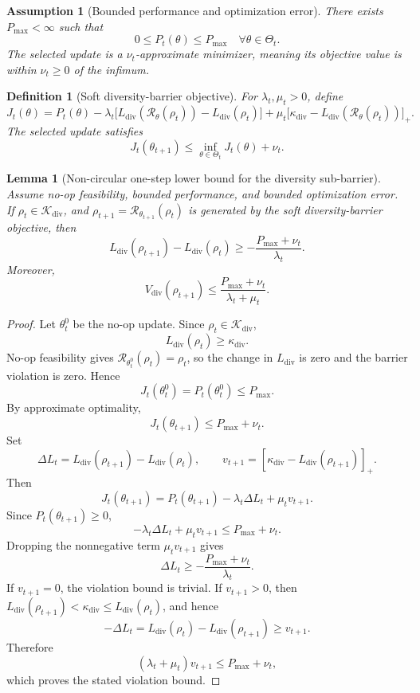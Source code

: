 \documentclass[11pt]{article}
\newtheorem{lemma}[theorem]{Lemma}
\newtheorem{definition}[theorem]{Definition}
\newtheorem{assumption}[theorem]{Assumption}
\newcommand{\K}{\mathcal{K}}
\newcommand{\Rcal}{\mathcal{R}}
\newcommand{\1}{\mathbf{1}}
\newcommand{\diver}{\mathrm{div}}
\begin{document}
\begin{assumption}[Bounded performance and optimization error]
There exists \(P_{\max}<\infty\) such that
\[
0\le P_t(\theta)\le P_{\max}
\quad\forall\theta\in\Theta_t.
\]
The selected update is a \(\nu_t\)-approximate minimizer, meaning its objective value is within \(\nu_t\ge0\) of the infimum.
\end{assumption}

\begin{definition}[Soft diversity-barrier objective]
For \(\lambda_t,\mu_t>0\), define
\[
J_t(\theta)
=
P_t(\theta)
-
\lambda_t\bigl[L_{\diver}(\Rcal_\theta(\rho_t))-L_{\diver}(\rho_t)\bigr]
+
\mu_t\bigl[\kappa_{\diver}-L_{\diver}(\Rcal_\theta(\rho_t))\bigr]_+.
\]
The selected update satisfies
\[
J_t(\theta_{t+1})
\le
\inf_{\theta\in\Theta_t}J_t(\theta)+\nu_t.
\]
\end{definition}

\begin{lemma}[Non-circular one-step lower bound for the diversity sub-barrier]
\label{lem:div_soft_bound}
Assume no-op feasibility, bounded performance, and bounded optimization error. If \(\rho_t\in\K_{\diver}\), and \(\rho_{t+1}=\Rcal_{\theta_{t+1}}(\rho_t)\) is generated by the soft diversity-barrier objective, then
\[
L_{\diver}(\rho_{t+1})-L_{\diver}(\rho_t)
\ge
-\frac{P_{\max}+\nu_t}{\lambda_t}.
\]
Moreover,
\[
V_{\diver}(\rho_{t+1})
\le
\frac{P_{\max}+\nu_t}{\lambda_t+\mu_t}.
\]
\end{lemma}

\begin{proof}
Let \(\theta_t^0\) be the no-op update. Since \(\rho_t\in\K_{\diver}\),
\[
L_{\diver}(\rho_t)\ge\kappa_{\diver}.
\]
No-op feasibility gives \(\Rcal_{\theta_t^0}(\rho_t)=\rho_t\), so the change in \(L_{\diver}\) is zero and the barrier violation is zero. Hence
\[
J_t(\theta_t^0)=P_t(\theta_t^0)\le P_{\max}.
\]
By approximate optimality,
\[
J_t(\theta_{t+1})\le P_{\max}+\nu_t.
\]
Set
\[
\Delta L_t=L_{\diver}(\rho_{t+1})-L_{\diver}(\rho_t),
\qquad
v_{t+1}=[\kappa_{\diver}-L_{\diver}(\rho_{t+1})]_+.
\]
Then
\[
J_t(\theta_{t+1})
=P_t(\theta_{t+1})-\lambda_t\Delta L_t+\mu_t v_{t+1}.
\]
Since \(P_t(\theta_{t+1})\ge0\),
\[
-\lambda_t\Delta L_t+\mu_t v_{t+1}
\le P_{\max}+\nu_t.
\]
Dropping the nonnegative term \(\mu_t v_{t+1}\) gives
\[
\Delta L_t\ge-\frac{P_{\max}+\nu_t}{\lambda_t}.
\]
If \(v_{t+1}=0\), the violation bound is trivial. If \(v_{t+1}>0\), then \(L_{\diver}(\rho_{t+1})<\kappa_{\diver}\le L_{\diver}(\rho_t)\), and hence
\[
-\Delta L_t=L_{\diver}(\rho_t)-L_{\diver}(\rho_{t+1})\ge v_{t+1}.
\]
Therefore
\[
(\lambda_t+
\mu_t)v_{t+1}
\le
P_{\max}+\nu_t,
\]
which proves the stated violation bound.
\end{proof}
\end{document}
